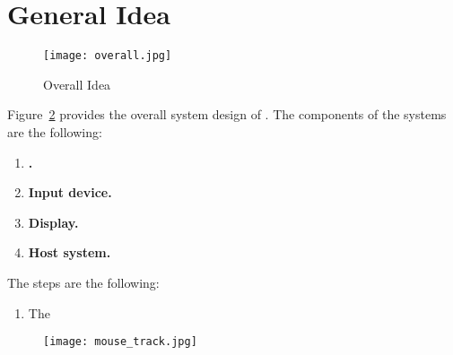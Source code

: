 \section{General Idea}

\begin{figure}
\centering
\texttt{[image: overall.jpg]}
\caption{Overall Idea}
\label{fig:overallIdea}
\centering
\end{figure}


Figure~\ref{fig:overallIdea} provides the overall system design of \name. The components of the systems are the following:

\begin{enumerate}
  \item \textbf{\device.}
  \item \textbf{Input device.}
  \item \textbf{Display.}
  \item \textbf{Host system.}
\end{enumerate}

The steps are the following:

\begin{enumerate}
  \item The \device
\end{enumerate}


\begin{figure}
\centering
\texttt{[image: mouse\_track.jpg]}
\caption{}
\label{fig:overallIdea}
\centering
\end{figure}


